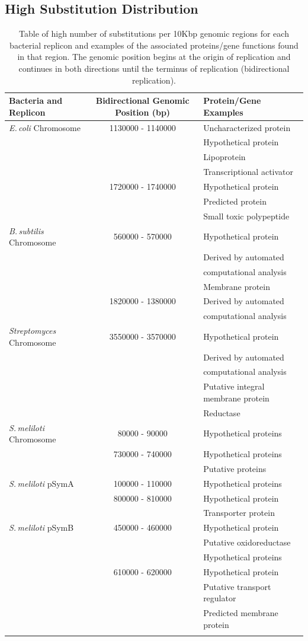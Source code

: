 \documentclass[11pt]{article}
\newcommand{\smel}{\textit{S.\,meliloti}\xspace}
\newcommand{\strep}{\textit{Streptomyces}\xspace}
\newcommand{\ecol}{\textit{E.\,coli}\xspace}
\newcommand{\bass}{\textit{B.\,subtilis}\xspace}
\newcommand{\pa}{pSymA\xspace}
\newcommand{\pb}{pSymB\xspace}
\begin{document}
\subsection{High Substitution Distribution}
\begin{longtable}{lcl}
	\hline
	Bacteria and Replicon & Bidirectional Genomic Position (bp) & Protein/Gene Examples \\ \hline
	\ecol Chromosome & 1130000 - 1140000 & Uncharacterized protein\\
	& & Hypothetical protein\\
	& & Lipoprotein\\ 
	& & Transcriptional activator\\ 
	& 1720000 - 1740000 & Hypothetical protein\\
	& & Predicted protein\\
	& & Small toxic polypeptide\\ \hline
	\bass Chromosome & 560000 - 570000 & Hypothetical protein\\
	& & Derived by automated\\
	& & computational analysis\\
	& & Membrane protein\\
	& 1820000 - 1380000 & Derived by automated\\
	& & computational analysis\\ \hline
	\strep Chromosome & 3550000 - 3570000 & Hypothetical protein\\
	& & Derived by automated\\
	&  & computational analysis\\
	& & Putative integral membrane protein\\
	& & Reductase \\ \hline
	\smel Chromosome & 80000 - 90000 & Hypothetical proteins\\
	&  730000 - 740000 & Hypothetical proteins\\
	& & Putative proteins\\\hline
	\smel \pa & 100000 - 110000 & Hypothetical proteins\\
	& 800000 - 810000 & Hypothetical protein \\
	& & Transporter protein \\ \hline
	\smel \pb & 450000 - 460000 & Hypothetical protein\\
	& & Putative oxidoreductase\\
	& & Hypothetical proteins\\
	& 610000 - 620000 & Hypothetical protein\\
	& & Putative transport regulator\\
	& & Predicted membrane protein\\ \hline
	\caption{\label{tab:high_sub_bars} Table of high number of substitutions per 10Kbp genomic regions for each bacterial replicon and examples of the associated proteins/gene functions found in that region. The genomic position begins at the origin of replication and continues in both directions until the terminus of replication (bidirectional replication).}
\end{longtable}
\end{document}
